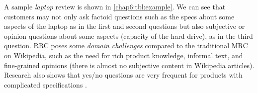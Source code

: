 \begin{table}
    \centering
    \caption{Review reading comprehension}
    \label{chap6:tbl:example}
\end{table}

A sample \emph{laptop} review is shown in \ref{chap6:tbl:example}. 
We can see that customers may not only ask factoid questions such as the specs about some aspects of the laptop as in the first and second questions but also subjective or opinion questions about some aspects (capacity of the hard drive), as in the third question.
RRC poses some \textit{domain challenges} compared to the traditional MRC on Wikipedia, such as the need for rich product knowledge, informal text, and fine-grained opinions (there is almost no subjective content in Wikipedia articles). Research also shows that yes/no questions are very frequent for products with complicated specifications \cite{mcauley2016addressing,Xu2018pro}.

